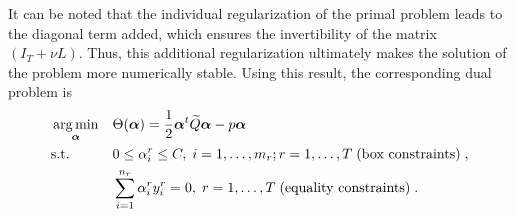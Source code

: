 It can be noted that the individual regularization of the primal problem leads to the diagonal term added, which ensures the invertibility of the matrix $(I_T + \nu L)$.
Thus, this additional regularization ultimately makes the solution of the problem more numerically stable.
Using this result, the corresponding dual problem is
\begin{equation}\label{eq:linear_gl_dual}
    \begin{aligned}
        & \argmin_{\fv{\alpha}} 
        & & \Theta(\fv{\alpha}) = \frac{1}{2} \fv{\alpha}^t \widetilde{Q} \fv{\alpha} - p \fv{\alpha} \\
        & \text{s.t.}
        & & 0 \leq \alpha_i^r \leq C, \;  i=1,\ldots,m_r; r=1,\ldots,T\; \text{(box constraints)} \; , \\
        & & & \sum_{i=1}^{n_r}{\alpha_i^r y_i^r} = 0, \; r=1,\ldots,T\; \text{(equality constraints)} \; .
        \end{aligned}
\end{equation}

